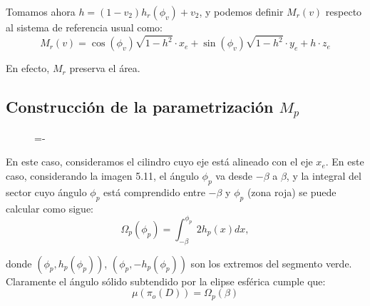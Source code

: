 Tomamos ahora $h = (1-v_2)h_r(\phi_v) + v_2$, y podemos definir $M_r(v)$ respecto al sistema de referencia usual como:
$$M_r(v) = \cos(\phi_v)\sqrt{1-h^2}\cdot x_e +\sin(\phi_v)\sqrt{1-h^2}\cdot y_e +h\cdot z_e$$

En efecto, $M_r$ preserva el área.

\subsection{Construcción de la parametrización $M_p$}

\begin{figure}[h]
  \lineskip=-\fboxrule
\end{figure}

En este caso, consideramos el cilindro cuyo eje está alineado con el eje $x_e$. En este caso, considerando la imagen 5.11, el ángulo $\phi_p$ va desde $-\beta$ a $\beta$, y la integral del sector cuyo ángulo $\phi_p$ está comprendido entre $-\beta$ y $\phi_p$ (zona roja) se puede calcular como sigue:
$$\Omega_p(\phi_p)=\int_{-\beta}^{\phi_p}2h_p(x)dx,$$

donde $(\phi_p, h_p(\phi_p))$, $(\phi_p, -h_p(\phi_p))$ son los extremos del segmento verde. Claramente el ángulo sólido subtendido por la elipse esférica cumple que:
$$\mu(\pi_o(D)) = \Omega_p(\beta)$$

